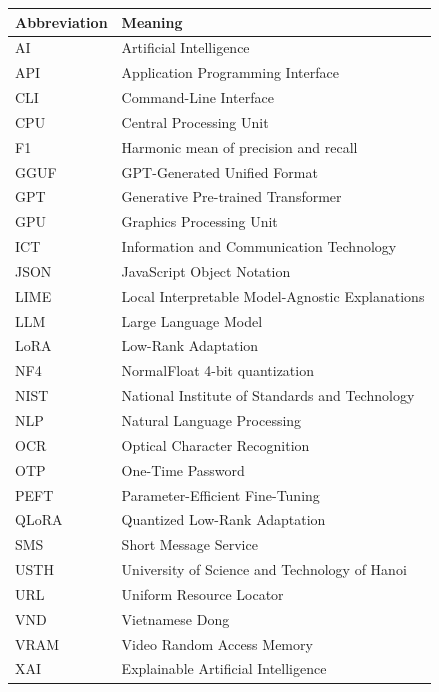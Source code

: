 \begin{longtable}{@{}p{}L{0.68\textwidth}@{}}
\toprule
\textbf{Abbreviation} & \textbf{Meaning} \\
\midrule
AI & Artificial Intelligence \\
API & Application Programming Interface \\
CLI & Command-Line Interface \\
CPU & Central Processing Unit \\
F1 & Harmonic mean of precision and recall \\
GGUF & GPT-Generated Unified Format \\
GPT & Generative Pre-trained Transformer \\
GPU & Graphics Processing Unit \\
ICT & Information and Communication Technology \\
JSON & JavaScript Object Notation \\
LIME & Local Interpretable Model-Agnostic Explanations \\
LLM & Large Language Model \\
LoRA & Low-Rank Adaptation \\
NF4 & NormalFloat 4-bit quantization \\
NIST & National Institute of Standards and Technology \\
NLP & Natural Language Processing \\
OCR & Optical Character Recognition \\
OTP & One-Time Password \\
PEFT & Parameter-Efficient Fine-Tuning \\
QLoRA & Quantized Low-Rank Adaptation \\
SMS & Short Message Service \\
USTH & University of Science and Technology of Hanoi \\
URL & Uniform Resource Locator \\
VND & Vietnamese Dong \\
VRAM & Video Random Access Memory \\
XAI & Explainable Artificial Intelligence \\
\bottomrule
\end{longtable}

\clearpage
\chapter*{\listtablename}
{\singlespacing
\makeatletter{}\makeatother
}

